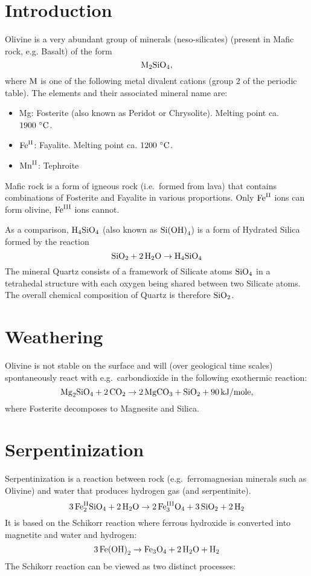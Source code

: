 \documentclass[a4paper,14pt]{extarticle}
\def\H{{\rm H}}
\def\O{{\rm O}}
\def\M{{\rm M}}
\def\C{{\rm C}}
\def\Fe{{\rm Fe}}
\def\Mg{{\rm Mg}}
\def\Mn{{\rm Mn}}
\def\Si{{\rm Si}}
\def\II{{\rm II}}
\def\III{{\rm III}}
\begin{document}

\section{Introduction}

Olivine\cite{olivine} is a very abundant group of minerals (neso-silicates\cite{orthosilicate}) (present in Mafic rock,
e.g. Basalt) of the form
\[
    \M_2\Si\O_4,
\]
where $\M$ is one of the following metal divalent cations (group 2 of the periodic table).  The
elements and their associated mineral name are:
\begin{itemize}
    \itemsep=0em
    \item\Mg: Fosterite (also known as Peridot or Chrysolite). Melting point ca. $1900\ {}^\circ\C$.
    \item$\Fe^{\II}$: Fayalite. Melting point ca. $1200\ {}^\circ\C$.
    \item$\Mn^{\II}$: Tephroite
\end{itemize}
Mafic\cite{mafic} rock is a form of igneous rock (i.e.\ formed from lava) that contains combinations of Fosterite and Fayalite in
various proportions.  Only $\Fe^{\II}$ ions can form olivine, $\Fe^{\III}$ ions cannot.

As a comparison, $\H_4\Si\O_4$ (also known as $\Si{(\O\H)}_4$) is a form of Hydrated Silica\cite{hydrated_silica} formed
by the reaction
\[
    \Si\O_2 + 2\, \H_2\O \rightarrow \H_4\Si\O_4
\]
The mineral Quartz\cite{quartz} consists of a framework of Silicate atoms $\Si\O_4$ in a tetrahedal structure with each
oxygen being shared between two Silicate atoms. The overall chemical composition of Quartz is therefore $\Si\O_2$.


\section{Weathering}
Olivine is not stable on the surface and will (over geological time scales) spontaneously react with e.g.\ carbondioxide
in the following exothermic reaction:
\[
    \Mg_2\Si\O_4 + 2\,\C\O_2 \rightarrow 2\,\Mg\C\O_3 + \Si\O_2 + 90\, {\rm kJ / mole},
\]
where Fosterite decomposes to Magnesite and Silica.

\section{Serpentinization}

Serpentinization\cite{serpentinization} is a reaction between rock (e.g.\ ferromagnesian minerals such as Olivine) and
water that produces hydrogen gas (and serpentinite).
\[
    3\, \Fe^{\II}_2\Si \O_4 + 2\,\H_2\O \rightarrow 2\,\Fe^{\III}_3\O_4 + 3\,\Si \O_2 + 2\,\H_2
\]
It is based on the Schikorr reaction\cite{schikorr_reaction} where ferrous hydroxide is converted into magnetite and
water and hydrogen:
\[
    3\, \Fe{(\O\H)}_2 \rightarrow \Fe_3\O_4 + 2\,\H_2\O + \H_2
\]
The Schikorr reaction can be viewed as two distinct processes:
\end{document}
